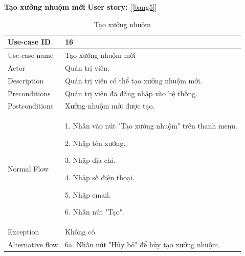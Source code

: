 \textbf{Tạo xưởng nhuộm mới}
\textbf{User story:} [\ref{bang5}]
\begin{table}[!htp]
    \centering
    \begin{tabular}{|m{3cm}|m{10cm}|}
    \hline 
        Use-case ID & 16\\ \hline
        Use-case name & Tạo xưởng nhuộm mới\\ \hline
        Actor & Quản trị viên.\\ \hline
        Description & Quản trị viên có thể tạo xưởng nhuộm mới.\\ \hline
        Preconditions & Quản trị viên đã đăng nhập vào hệ thống.\\ \hline
        Postconditions & Xưởng nhuộm mới được tạo.\\ \hline
        Normal Flow & 
        1. Nhấn vào nút "Tạo xưởng nhuộm" trên thanh menu.\par 
        2. Nhập tên xưởng.\par
        3. Nhập địa chỉ.\par
        4. Nhập số điện thoại.\par
        5. Nhập email.\par
        6. Nhấn nút "Tạo".
        \\ \hline
        Exception & Không có.
        \\ \hline
        Alternative flow & 
        6a. Nhấn nút "Hủy bỏ" để hủy tạo xưởng nhuộm.
        \\ 
    \hline 
    \end{tabular}
    \caption{Tạo xưởng nhuộm}
    \label{bang16}
\end{table}


